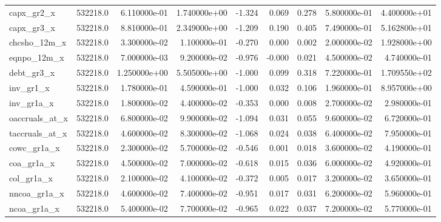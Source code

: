 \documentclass[12pt]{article}
\begin{document}
\begin{landscape}
\begin{longtable}{|l|r|r|r|r|r|r|r|r|}
capx\_gr2\_x             &  532218.0 &  6.110000e-01 &  1.740000e+00 &      -1.324 &        0.069 &        0.278 &  5.800000e-01 &  4.400000e+01 \\
capx\_gr3\_x             &  532218.0 &  8.810000e-01 &  2.349000e+00 &      -1.209 &        0.190 &        0.405 &  7.490000e-01 &  5.162800e+01 \\
chcsho\_12m\_x           &  532218.0 &  3.300000e-02 &  1.100000e-01 &      -0.270 &        0.000 &        0.002 &  2.000000e-02 &  1.928000e+00 \\
eqnpo\_12m\_x            &  532218.0 &  7.000000e-03 &  9.200000e-02 &      -0.976 &       -0.000 &        0.021 &  4.500000e-02 &  4.740000e-01 \\
debt\_gr3\_x             &  532218.0 &  1.250000e+00 &  5.505000e+00 &      -1.000 &        0.099 &        0.318 &  7.220000e-01 &  1.709550e+02 \\
inv\_gr1\_x              &  532218.0 &  1.780000e-01 &  4.590000e-01 &      -1.000 &        0.032 &        0.106 &  1.960000e-01 &  8.957000e+00 \\
inv\_gr1a\_x             &  532218.0 &  1.800000e-02 &  4.400000e-02 &      -0.353 &        0.000 &        0.008 &  2.700000e-02 &  2.980000e-01 \\
oaccruals\_at\_x         &  532218.0 &  6.800000e-02 &  9.900000e-02 &      -1.094 &        0.031 &        0.055 &  9.600000e-02 &  6.720000e-01 \\
taccruals\_at\_x         &  532218.0 &  4.600000e-02 &  8.300000e-02 &      -1.068 &        0.024 &        0.038 &  6.400000e-02 &  7.950000e-01 \\
cowc\_gr1a\_x            &  532218.0 &  2.300000e-02 &  5.700000e-02 &      -0.546 &        0.001 &        0.018 &  3.600000e-02 &  4.190000e-01 \\
coa\_gr1a\_x             &  532218.0 &  4.500000e-02 &  7.000000e-02 &      -0.618 &        0.015 &        0.036 &  6.000000e-02 &  4.920000e-01 \\
col\_gr1a\_x             &  532218.0 &  2.100000e-02 &  4.100000e-02 &      -0.372 &        0.005 &        0.017 &  3.200000e-02 &  3.650000e-01 \\
nncoa\_gr1a\_x           &  532218.0 &  4.600000e-02 &  7.400000e-02 &      -0.951 &        0.017 &        0.031 &  6.200000e-02 &  5.960000e-01 \\
ncoa\_gr1a\_x            &  532218.0 &  5.400000e-02 &  7.700000e-02 &      -0.965 &        0.022 &        0.037 &  7.200000e-02 &  5.770000e-01 \\

\end{longtable}
\end{landscape}
\end{document}
